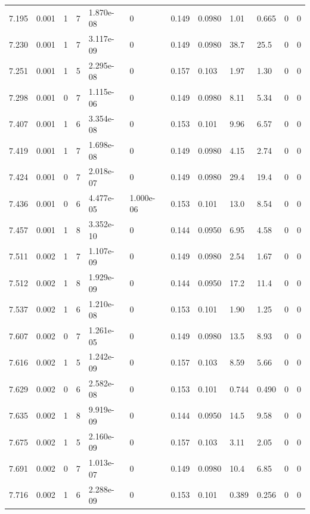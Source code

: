 \documentclass[preview]{standalone}
\begin{document}
{{{{{{{\begin{tabular}{L{1.2cm}C{1.2cm} C{0.3cm}C{0.5cm} C{1.4cm}C{1.4cm} C{1.4cm}C{1.4cm} C{1.6cm}C{1.6cm} C{1.6cm}C{1.6cm}}
  7.195  &  0.001  & 1     &  7 &  1.870e-08  & 0  &  0.149&   0.0980& 1.01 & 0.665   &  0 & 0  \\ 
  7.230  &  0.001  & 1     &  7 &  3.117e-09  & 0  &  0.149&   0.0980& 38.7 & 25.5   &  0 & 0  \\ 
  7.251  &  0.001  & 1     &  5 &  2.295e-08  & 0  &  0.157&   0.103& 1.97 & 1.30   &  0 & 0  \\ 
  7.298  &  0.001  & 0     &  7 &  1.115e-06  & 0  &  0.149&   0.0980& 8.11 & 5.34   &  0 & 0  \\ 
  7.407  &  0.001  & 1     &  6 &  3.354e-08  & 0  &  0.153&   0.101& 9.96 & 6.57   &  0 & 0  \\ 
  7.419  &  0.001  & 1     &  7 &  1.698e-08  & 0  &  0.149&   0.0980& 4.15 & 2.74   &  0 & 0  \\ 
  7.424  &  0.001  & 0     &  7 &  2.018e-07  & 0  &  0.149&   0.0980& 29.4 & 19.4   &  0 & 0  \\ 
  7.436  &  0.001  & 0     &  6 &  4.477e-05  & 1.000e-06  &  0.153&   0.101& 13.0 & 8.54   &  0 & 0  \\ 
  7.457  &  0.001  & 1     &  8 &  3.352e-10  & 0  &  0.144&   0.0950& 6.95 & 4.58   &  0 & 0  \\ 
  7.511  &  0.002  & 1     &  7 &  1.107e-09  & 0  &  0.149&   0.0980& 2.54 & 1.67   &  0 & 0  \\ 
  7.512  &  0.002  & 1     &  8 &  1.929e-09  & 0  &  0.144&   0.0950& 17.2 & 11.4   &  0 & 0  \\ 
  7.537  &  0.002  & 1     &  6 &  1.210e-08  & 0  &  0.153&   0.101& 1.90 & 1.25   &  0 & 0  \\ 
  7.607  &  0.002  & 0     &  7 &  1.261e-05  & 0  &  0.149&   0.0980& 13.5 & 8.93   &  0 & 0  \\ 
  7.616  &  0.002  & 1     &  5 &  1.242e-09  & 0  &  0.157&   0.103& 8.59 & 5.66   &  0 & 0  \\ 
  7.629  &  0.002  & 0     &  6 &  2.582e-08  & 0  &  0.153&   0.101& 0.744 & 0.490   &  0 & 0  \\ 
  7.635  &  0.002  & 1     &  8 &  9.919e-09  & 0  &  0.144&   0.0950& 14.5 & 9.58   &  0 & 0  \\ 
  7.675  &  0.002  & 1     &  5 &  2.160e-09  & 0  &  0.157&   0.103& 3.11 & 2.05   &  0 & 0  \\ 
  7.691  &  0.002  & 0     &  7 &  1.013e-07  & 0  &  0.149&   0.0980& 10.4 & 6.85   &  0 & 0  \\ 
  7.716  &  0.002  & 1     &  6 &  2.288e-09  & 0  &  0.153&   0.101& 0.389 & 0.256   &  0 & 0  \\ 

\end{tabular}}}}}}}}
\end{document}
